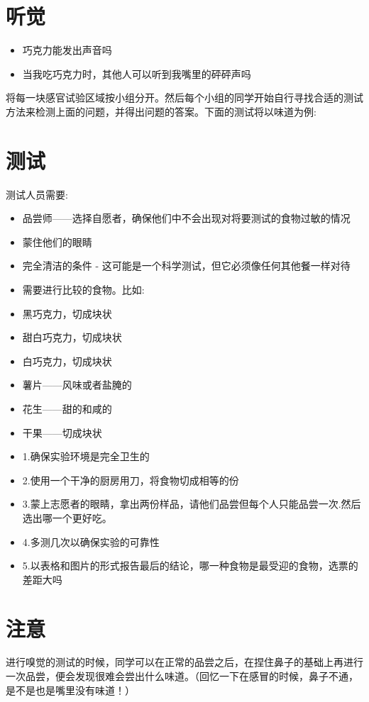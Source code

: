 \section{听觉}
       \begin{itemize}
         \item 巧克力能发出声音吗
         \item 当我吃巧克力时，其他人可以听到我嘴里的砰砰声吗
       \end{itemize}  

       \par
       将每一块感官试验区域按小组分开。然后每个小组的同学开始自行寻找合适的测试方法来检测上面的问题，并得出问题的答案。下面的测试将以味道为例:\par

\section{测试}
      测试人员需要:\par
      \begin{itemize}
        \item 品尝师——选择自愿者，确保他们中不会出现对将要测试的食物过敏的情况
        \item 蒙住他们的眼睛
        \item 完全清洁的条件 - 这可能是一个科学测试，但它必须像任何其他餐一样对待
        \item 需要进行比较的食物。比如:
        \item 黑巧克力，切成块状
        \item 甜白巧克力，切成块状 
        \item 白巧克力，切成块状
        \item 薯片——风味或者盐腌的
        \item 花生——甜的和咸的
        \item 干果——切成块状
        \item 1.确保实验环境是完全卫生的
        \item 2.使用一个干净的厨房用刀，将食物切成相等的份
        \item 3.蒙上志愿者的眼睛，拿出两份样品，请他们品尝但每个人只能品尝一次.然后选出哪一个更好吃。
        \item 4.多测几次以确保实验的可靠性
        \item 5.以表格和图片的形式报告最后的结论，哪一种食物是最受迎的食物，选票的差距大吗
      \end{itemize} 
      

      
\section{注意}
      进行嗅觉的测试的时候，同学可以在正常的品尝之后，在捏住鼻子的基础上再进行一次品尝，便会发现很难会尝出什么味道。（回忆一下在感冒的时候，鼻子不通，是不是也是嘴里没有味道！）



   
